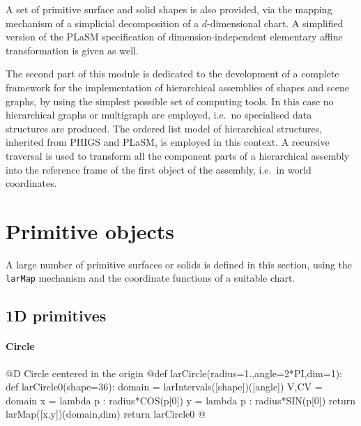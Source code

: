\documentclass[11pt,oneside]{article}	%
\begin{document}
A set of primitive surface and solid shapes is also provided, via the mapping mechanism of a simplicial decomposition of a $d$-dimensional chart. A simplified version of the PLaSM specification of dimension-independent elementary affine transformation is given as well.

The second part of this module is dedicated to the development of a complete framework for the implementation of hierarchical assemblies of shapes and scene graphs, by using the simplest possible set of computing tools. In this case no hierarchical graphs or multigraph are employed, i.e.~no specialised data structures are produced. The ordered list model of hierarchical structures, inherited from PHIGS and PLaSM, is employed in this context. A recursive traversal is used to transform all the component parts of a hierarchical assembly into the reference frame of the first object of the assembly, i.e.~in world coordinates.


\section{Primitive objects}
\label{sec:generators}

A large number of primitive surfaces or solids is defined in this section, using the \texttt{larMap} mechanism and the coordinate functions of a suitable chart.

\subsection{1D primitives}

\paragraph{Circle}
@D Circle centered in the origin
@{def larCircle(radius=1.,angle=2*PI,dim=1):
	def larCircle0(shape=36):
		domain = larIntervals([shape])([angle])
		V,CV = domain
		x = lambda p : radius*COS(p[0])
		y = lambda p : radius*SIN(p[0])
		return larMap([x,y])(domain,dim)
	return larCircle0
@}
\end{document}
